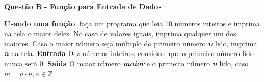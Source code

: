 \documentclass[a4paper, 12pt]{article}
\begin{document}
\newpage %
\begin{center}
\textbf{{\Large Questão B - Função para Entrada de Dados}}
\end{center}
\vspace{5pt}
\textbf{Usando uma função}, faça um programa que leia 10 números inteiros e imprima
na tela o maior deles. No caso de valores iguais, imprima qualquer um dos
maiores. Caso o maior número seja múltiplo do primeiro número \textbf{\textit{n}} lido, imprima \textbf{\textit{n}} na tela.
\newline \newline
\textbf{{\large Entrada}} \newline
Dez números inteiros, considere que o primeiro número lido nunca será 0.
\newline \newline
\textbf{{\large Saída}} \newline
O maior número \textbf{\textit{maior}} e o primeiro número \textbf{\textit{n}} lido, caso
$m = a \cdot n, a\in \mathbb{Z}$.
\newline
\end{document}

